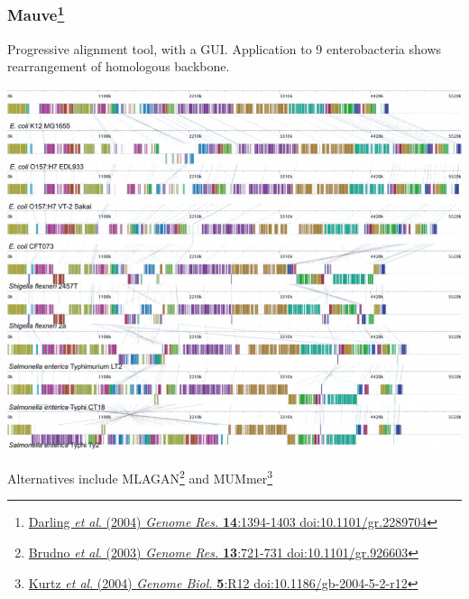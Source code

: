 \begin{frame}
  \frametitle{Mauve\footnote{\tiny{\href{http://dx.doi.org/10.1101/gr.2289704}{Darling \textit{et al}. (2004) \textit{Genome Res.} \textbf{14}:1394-1403 doi:10.1101/gr.2289704}}}}
  Progressive alignment tool, with a GUI. Application to 9 enterobacteria shows rearrangement of homologous backbone.
  \begin{center}
    \includegraphics[height=0.46\textheight]{images/mauve_entero}
  \end{center}        
  Alternatives include MLAGAN\footnote{\tiny{\href{http://dx.doi.org/10.1101/gr.926603}{Brudno \textit{et al}. (2003) \textit{Genome Res.} \textbf{13}:721-731 doi:10.1101/gr.926603}}} and MUMmer\footnote{\tiny{\href{http://dx.doi.org/10.1186/gb-2004-5-2-r12}{Kurtz \textit{et al}. (2004) \textit{Genome Biol.} \textbf{5}:R12 doi:10.1186/gb-2004-5-2-r12}}}
\end{frame}

